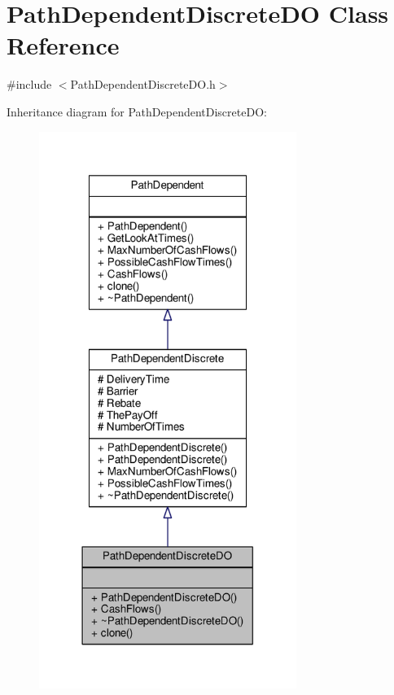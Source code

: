 \hypertarget{classPathDependentDiscreteDO}{}\section{Path\+Dependent\+Discrete\+DO Class Reference}
\label{classPathDependentDiscreteDO}


{\ttfamily \#include $<$Path\+Dependent\+Discrete\+D\+O.\+h$>$}



Inheritance diagram for Path\+Dependent\+Discrete\+DO\+:
\nopagebreak
\begin{figure}[H]
\begin{center}
\leavevmode
\includegraphics[width=237pt]{classPathDependentDiscreteDO__inherit__graph}
\end{center}
\end{figure}


